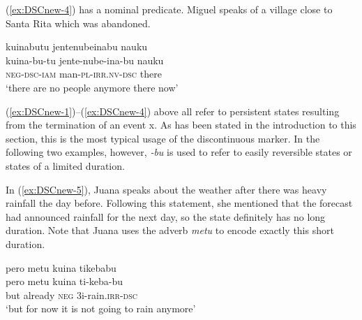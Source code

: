 %

(\ref{ex:DSCnew-4}) has a nominal predicate. Miguel speaks of a village close to Santa Rita which was abandoned.

\ea\label{ex:DSCnew-4}
\begingl
\glpreamble kuinabutu jentenubeinabu nauku\\
\gla kuina-bu-tu jente-nube-ina-bu nauku\\
\glb \textsc{neg}-\textsc{dsc}-\textsc{iam} man-\textsc{pl}-\textsc{irr.nv}-\textsc{dsc} there\\
\glft ‘there are no people anymore there now’
\endgl
\trailingcitation{[mty-p110906l.134]}
\xe

(\ref{ex:DSCnew-1})–(\ref{ex:DSCnew-4}) above all refer to persistent states resulting from the termination of an event x. As has been stated in the introduction to this section, this is the most typical usage of the discontinuous marker. In the following two examples, however, \textit{-bu} is used to refer to easily reversible states or states of a limited duration.

In (\ref{ex:DSCnew-5}), Juana speaks about the weather after there was heavy rainfall the day before. Following this statement, she mentioned that the forecast had announced rainfall for the next day, so the state definitely has no long duration. Note that Juana uses the adverb \textit{metu} to encode exactly this short duration.

\ea\label{ex:DSCnew-5}
\begingl
\glpreamble pero metu kuina tikebabu\\
\gla pero metu kuina ti-keba-bu\\
\glb but already \textsc{neg} 3i-rain.\textsc{irr}-\textsc{dsc}\\
\glft ‘but for now it is not going to rain anymore’
\endgl
\trailingcitation{[jxx-e120516l-1.101]}
\xe


